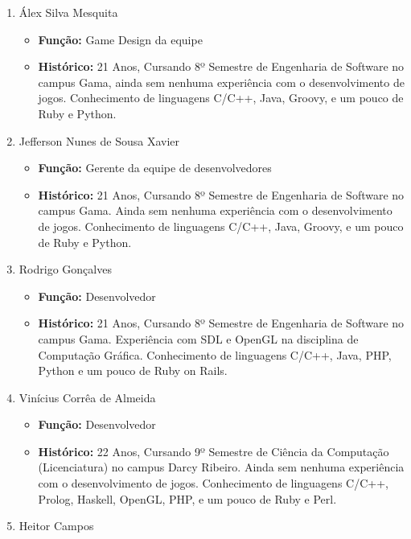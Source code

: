 \documentclass[a4paper, 11pt]{article} %
\begin{document}
\begin{enumerate}
\item Álex Silva Mesquita

\begin{itemize}
\item \textbf{Função:} Game Design da equipe
\item \textbf{Histórico:} 21 Anos, Cursando 8º Semestre de Engenharia de Software no campus Gama, ainda sem nenhuma experiência com o desenvolvimento de jogos. Conhecimento de linguagens C/C++, Java, Groovy, e um pouco de Ruby e Python.
\end{itemize}

\item Jefferson Nunes de Sousa Xavier

\begin{itemize}
\item \textbf{Função:} Gerente da equipe de desenvolvedores
\item \textbf{Histórico:} 21 Anos, Cursando 8º Semestre de Engenharia de Software no campus Gama. Ainda sem nenhuma experiência com o desenvolvimento de jogos. Conhecimento de linguagens C/C++, Java, Groovy, e um pouco de Ruby e Python.
\end{itemize}

\item Rodrigo Gonçalves

\begin{itemize}
\item \textbf{Função:} Desenvolvedor
\item \textbf{Histórico:} 21 Anos, Cursando 8º Semestre de Engenharia de Software no campus Gama. Experiência com SDL e OpenGL na disciplina de Computação Gráfica. Conhecimento de linguagens C/C++, Java, PHP, Python e um pouco de Ruby on Rails.
\end{itemize}

\item Vinícius Corrêa de Almeida

\begin{itemize}
\item \textbf{Função:} Desenvolvedor
\item \textbf{Histórico:} 22 Anos, Cursando 9º Semestre de Ciência da Computação (Licenciatura) no campus Darcy Ribeiro. Ainda sem nenhuma experiência com o desenvolvimento de jogos. Conhecimento de linguagens C/C++, Prolog, Haskell, OpenGL, PHP, e um pouco de Ruby e Perl.
\end{itemize}

\item Heitor Campos


\end{enumerate}
\end{document}
